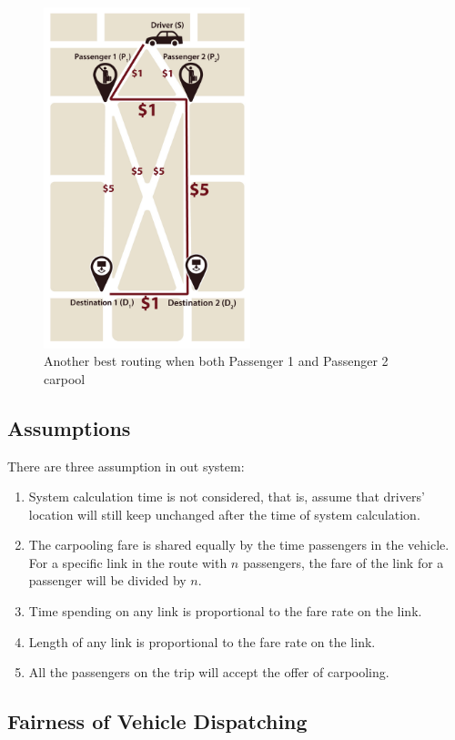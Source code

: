\begin{figure}[htp]
  \centering
  \captionsetup{justification=centering}
  \includegraphics[width=6cm]{figures/mapV2_3.jpg}
  \caption{Another best routing when both Passenger 1 and Passenger 2 carpool}
\end{figure}
\newpage

\subsection{Assumptions}

There are three assumption in out system:

\begin{enumerate}
  \item System calculation time is not considered, that is, assume that drivers' location will still keep unchanged after the time of system calculation.
  \item The carpooling fare is shared equally by the time passengers in the vehicle. For a specific link in the route with $n$ passengers, the fare of the link for a passenger will be divided by $n$.
  \item Time spending on any link is proportional to the fare rate on the link.
  \item Length of any link is proportional to the fare rate on the link.
  \item All the passengers on the trip will accept the offer of carpooling.
 \end{enumerate}

\subsection{Fairness of Vehicle Dispatching}

